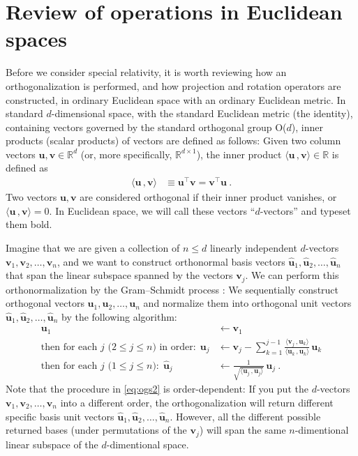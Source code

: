 \documentclass{article}
\newcommand{\Evec}[1]{{\mathbf{#1}}} %
\newcommand{\Ehat}[1]{{\mathbf{\hat{#1}}}} %
\newcommand{\inner}[2]{\langle{#1}\,,{#2}\rangle}
\begin{document}
\section{Review of operations in Euclidean spaces}\label{sec:od}

Before we consider special relativity, it is worth reviewing how an orthogonalization is performed, and how projection and rotation operators are constructed, in ordinary Euclidean space with an ordinary Euclidean metric.
In standard $d$-dimensional space, with the standard Euclidean metric (the identity), containing vectors governed by the standard orthogonal group O($d$), inner products (scalar products) of vectors are defined as follows:
Given two column vectors $\Evec{u},\Evec{v}\in\mathbb{R}^d$ (or, more specifically, $\mathbb{R}^{d\times1}$), the inner product $\inner{\Evec{u}}{\Evec{v}}\in\mathbb{R}$ is defined as
\begin{align}
    \inner{\Evec{u}}{\Evec{v}} &\equiv \Evec{u}^\top \Evec{v} = \Evec{v}^\top \Evec{u} ~.
\end{align}
Two vectors $\Evec{u},\Evec{v}$ are considered orthogonal if their inner product vanishes, or $\inner{\Evec{u}}{\Evec{v}}=0$.
In Euclidean space, we will call these vectors ``$d$-vectors'' and typeset them bold.

Imagine that we are given a collection of $n\leq d$ linearly independent $d$-vectors $\Evec{v}_1,\Evec{v}_2,\ldots,\Evec{v}_n$,
and we want to construct orthonormal basis vectors $\Ehat{u}_1,\Ehat{u}_2,\ldots,\Ehat{u}_n$ that span the linear subspace spanned by the vectors $\Evec{v}_j$.
We can perform this orthonormalization by the Gram--Schmidt process \cite{gramschmidt}:
We sequentially construct orthogonal vectors $\Evec{u}_1,\Evec{u}_2,\ldots,\Evec{u}_n$ and normalize them into orthogonal unit vectors $\Ehat{u}_1,\Ehat{u}_2,\ldots,\Ehat{u}_n$ by the following algorithm:
\begin{align}
    \Evec{u}_1 &\leftarrow \Evec{v}_1 \label{eq:ogs1}
    \\
    \mbox{then for each $j$ ($2\leq j\leq n$) in order:} ~~ \Evec{u}_j &\leftarrow \Evec{v}_j - \sum_{k=1}^{j-1} \frac{\inner{\Evec{v}_j}{\Evec{u}_k}}{\inner{\Evec{u}_k}{\Evec{u}_k}}\,\Evec{u}_k \label{eq:ogs2}
    \\
    \mbox{then for each $j$ ($1\leq j\leq n$):} ~~ \Ehat{u}_j &\leftarrow \frac{1}{\sqrt{\inner{\Evec{u}_j}{\Evec{u}_j}}}\,\Evec{u}_j ~. \label{eq:ogs3}
\end{align}
Note that the procedure in \eqref{eq:ogs2} is order-dependent: If you put the $d$-vectors $\Evec{v}_1,\Evec{v}_2,\ldots,\Evec{v}_n$ into a different order, the orthogonalization will return different specific basis unit vectors $\Ehat{u}_1,\Ehat{u}_2,\ldots,\Ehat{u}_n$.
However, all the different possible returned bases (under permutations of the $\Evec{v}_j$) will span the same $n$-dimentional linear subspace of the $d$-dimentional space.
\end{document}
